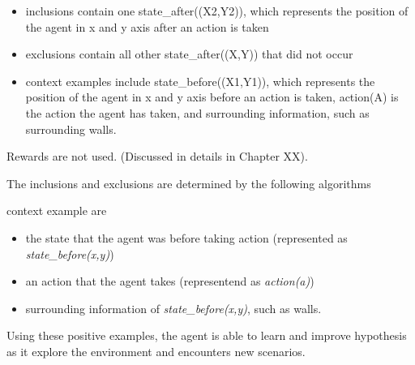 \begin{itemize}
    \item inclusions contain one state\_after((X2,Y2)), which represents the position of the agent in x and y axis after an action is taken
    \item exclusions contain all other state\_after((X,Y)) that did not occur
    \item context examples include state\_before((X1,Y1)), which represents the position of the agent in x and y axis before an action is taken,
    action(A) is the action the agent has taken, and surrounding information, such as surrounding walls.
\end{itemize}

Rewards are not used.
(Discussed in details in Chapter XX).


The inclusions and exclusions are determined by the following algorithms

context example are
\begin{itemize}
    \item the state that the agent was before taking action (represented as \textit{state\_before(x,y)})
    \item an action that the agent takes (representend as \textit{action(a)})
    \item surrounding information of \textit{state\_before(x,y)}, such as walls.
\end{itemize}


Using these positive examples, the agent is able to learn and improve hypothesis as it explore the environment and encounters new scenarios.

